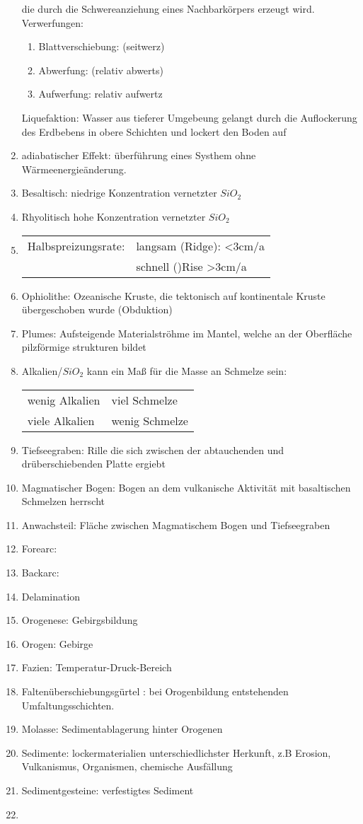\documentclass[a4,12pt]{scrartcl}
\begin{document}
\begin{enumerate}
die durch die Schwereanziehung eines Nachbarkörpers erzeugt 
wird.
Verwerfungen:
\begin{enumerate}
\item Blattverschiebung: (seitwerz)
\item Abwerfung: (relativ abwerts)
\item Aufwerfung: relativ aufwertz
\end{enumerate}
Liquefaktion: Wasser aus tieferer Umgebeung gelangt durch die Auflockerung des Erdbebens in obere Schichten und lockert den Boden auf\\
\item adiabatischer Effekt: überführung eines Systhem ohne Wärmeenergieänderung.
\item Besaltisch: niedrige Konzentration vernetzter $SiO_2$
\item Rhyolitisch hohe Konzentration vernetzter $SiO_2$
\item \begin{tabular}{ll}
Halbspreizungsrate: & langsam (Ridge): <3cm/a \\
 & schnell ()Rise >3cm/a
\end{tabular}
\item Ophiolithe: Ozeanische Kruste, die tektonisch auf kontinentale Kruste übergeschoben wurde (Obduktion)
\item Plumes: Aufsteigende Materialströhme im Mantel, welche an der Oberfläche pilzförmige strukturen bildet
\item Alkalien/$SiO_2$ kann ein Maß für die Masse an Schmelze sein:\\
\begin{tabular}{ll}
wenig Alkalien & viel Schmelze\\
viele Alkalien & wenig Schmelze\\
\end{tabular} 
\item Tiefseegraben: Rille die sich zwischen der abtauchenden und drüberschiebenden Platte ergiebt
\item Magmatischer Bogen: Bogen an dem vulkanische Aktivität mit basaltischen Schmelzen herrscht
\item Anwachsteil: Fläche zwischen Magmatischem Bogen und Tiefseegraben
\item Forearc: 
\item Backarc:
\item Delamination
\item Orogenese: Gebirgsbildung
\item Orogen: Gebirge
\item Fazien: Temperatur-Druck-Bereich
\item Faltenüberschiebungsgürtel : bei Orogenbildung entstehenden Umfaltungsschichten.
\item Molasse: Sedimentablagerung hinter Orogenen
\item Sedimente: lockermaterialien unterschiedlichster Herkunft, z.B Erosion, Vulkanismus, Organismen, chemische Ausfällung
\item Sedimentgesteine: verfestigtes Sediment
\item 
\end{enumerate}
\end{document}
